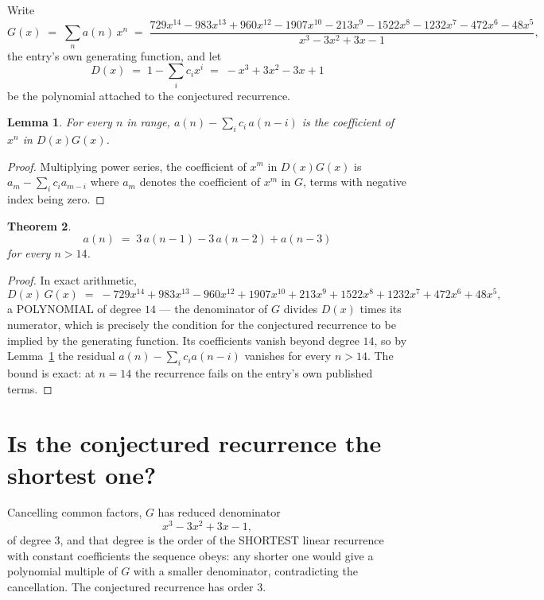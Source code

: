 \documentclass[11pt,a4paper]{article}
\theoremstyle{plain}
\newtheorem{theorem}{Theorem}
\newtheorem{lemma}[theorem]{Lemma}
\theoremstyle{definition}
\begin{document}
Write
\[
G(x)\;=\;\sum_{n}a(n)\,x^{n}\;=\;\frac{729 x^{14} - 983 x^{13} + 960 x^{12} - 1907 x^{10} - 213 x^{9} - 1522 x^{8} - 1232 x^{7} - 472 x^{6} - 48 x^{5}}{x^{3} - 3 x^{2} + 3 x - 1},
\]
the entry's own generating function, and let
\[
D(x)\;=\;1-\sum_i c_i x^{i}\;=\;- x^{3} + 3 x^{2} - 3 x + 1
\]
be the polynomial attached to the conjectured recurrence.

\begin{lemma}\label{lem:key}
For every $n$ in range, $a(n)-\sum_i c_i\,a(n-i)$ is the coefficient of $x^{n}$ in
$D(x)G(x)$.
\end{lemma}

\begin{proof}
Multiplying power series, the coefficient of $x^{m}$ in $D(x)G(x)$ is
$a_m-\sum_i c_i a_{m-i}$ where $a_m$ denotes the coefficient of $x^{m}$ in $G$, terms with
negative index being zero.
\end{proof}

\begin{theorem}
\[
a(n)\;=\;3\,a(n-1) - 3\,a(n-2) + a(n-3)
\]
for every $n>14$.
\end{theorem}

\begin{proof}
In exact arithmetic,
\[
D(x)\,G(x)\;=\;- 729 x^{14} + 983 x^{13} - 960 x^{12} + 1907 x^{10} + 213 x^{9} + 1522 x^{8} + 1232 x^{7} + 472 x^{6} + 48 x^{5},
\]
a POLYNOMIAL of degree $14$ --- the denominator of $G$ divides $D(x)$ times its numerator,
which is precisely the condition for the conjectured recurrence to be implied by the
generating function. Its coefficients vanish beyond degree $14$, so by
Lemma~\ref{lem:key} the residual $a(n)-\sum_ic_ia(n-i)$ vanishes for every
$n>14$. The bound is exact: at $n=14$ the recurrence fails on the entry's own published terms.
\end{proof}

\section{Is the conjectured recurrence the shortest one?}

Cancelling common factors, $G$ has reduced denominator
\[
x^{3} - 3 x^{2} + 3 x - 1,
\]
of degree $3$, and that degree is the order of the SHORTEST linear recurrence with
constant coefficients the sequence obeys: any shorter one would give a polynomial multiple of
$G$ with a smaller denominator, contradicting the cancellation. The conjectured recurrence has
order $3$.
\end{document}
